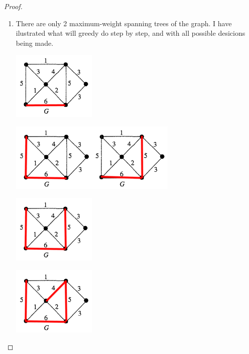 \begin{proof}
\begin{enumerate}
	\item 
            There are only 2 maximum-weight spanning trees of the graph. I have ilustrated what will greedy do step by step,
            and with all possible desicions being made.
            \begin{center}
                \includegraphics[width=4cm]{Test1/Problem14/Fig-i-1.png}
            \end{center}
            
            \begin{center}
                \includegraphics[width=8cm]{Test1/Problem14/Fig-i-2.png}
            \end{center}
            
            \begin{center}
                \includegraphics[width=4cm]{Test1/Problem14/Fig-i-3.png}
            \end{center}
            
            \begin{center}
                \includegraphics[width=4cm]{Test1/Problem14/Fig-i-4.png}
            \end{center}
            

\end{enumerate}
\end{proof}
